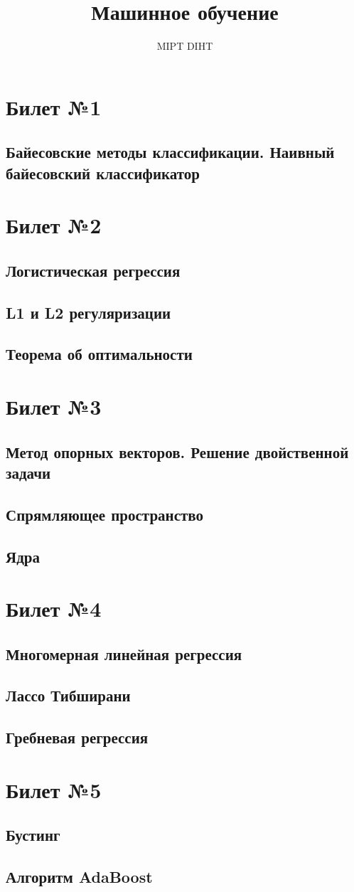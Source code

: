 \documentclass[a4paper]{article}
\title{Машинное обучение}
\author{MIPT DIHT}
\theoremstyle{plain}
\theoremstyle{remark}
\theoremstyle{definition}
\begin{document}
\maketitle

\section{Билет №1}
\subsection{Байесовские методы классификации. Наивный байесовский классификатор}

\section{Билет №2}
\subsection{Логистическая регрессия}
\subsection{L1 и L2 регуляризации}
\subsection{Теорема об оптимальности}

\section{Билет №3}
\subsection{Метод опорных векторов. Решение двойственной задачи}
\subsection{Спрямляющее пространство}
\subsection{Ядра}

\section{Билет №4}
\subsection{Многомерная линейная регрессия}
\subsection{Лассо Тибширани}
\subsection{Гребневая регрессия}

\section{Билет №5}
\subsection{Бустинг}
\subsection{Алгоритм AdaBoost}
\end{document}
